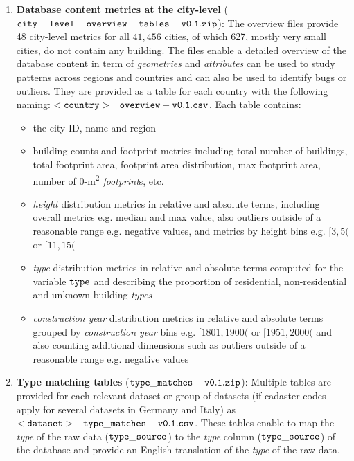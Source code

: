 \documentclass[fleqn,10pt]{wlscirep}
\begin{document}
\begin{enumerate}[topsep=1pt]
    \item \textbf{Database content metrics at the city-level} (${\tt city-level-overview-tables-v0.1.zip}$): The overview files provide 48 city-level metrics for all $41,456$ cities, of which 627, mostly very small cities, do not contain any building. The files enable a detailed overview of the database content in term of \textit{geometries} and \textit{attributes} can be used to study patterns across regions and countries and can also be used to identify bugs or outliers. They are provided as a table for each country with the following naming: ${\tt <country>\_overview-v0.1.csv}$. Each table contains:
    
    \begin{itemize}[topsep=1pt]
        \itemsep-0.05em  
        \item the city ID, name and region
        \item building counts and footprint metrics including total number of buildings, total footprint area, footprint area distribution, max footprint area, number of 0-m\textsuperscript{2} \textit{footprint}s, etc.
        \item \textit{height} distribution metrics in relative and absolute terms, including overall metrics e.g. median and max value, also outliers outside of a reasonable range e.g. negative values, and metrics by height bins e.g. $[3,5($ or $[11,15($
        \item \textit{type} distribution metrics in relative and absolute terms computed for the variable $\tt{type}$ and describing the proportion of residential, non-residential and unknown building \textit{types}
        \item \textit{construction year} distribution metrics in relative and absolute terms grouped by \textit{construction year} bins e.g. $[1801,1900($ or $[1951,2000($ and also counting additional dimensions such as outliers outside of a reasonable range e.g. negative values 
    \end{itemize}

    \item \textbf{Type matching tables} (${\tt type\_matches-v0.1.zip}$): Multiple tables are provided for each relevant dataset or group of datasets (if cadaster codes apply for several datasets in Germany and Italy) as ${\tt <dataset>-type\_matches-v0.1.csv}$. These tables enable to map the \textit{type} of the raw data (${\tt type\_source}$) to the \textit{type} column (${\tt type\_source}$) of the database and provide an English translation of the \textit{type} of the raw data.
    

\end{enumerate}
\end{document}
